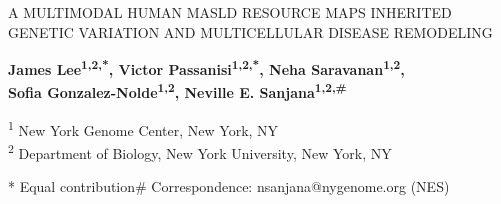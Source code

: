 \documentclass[10pt,letterpaper]{article}
\begin{document}
\thispagestyle{plain}
\vspace*{0.25in}
\begin{center}
{\fontsize{16}{18}\selectfont\MakeUppercase{A multimodal human MASLD resource maps inherited genetic variation and multicellular disease remodeling}\par}
\vspace{1.5em}
{\bfseries James Lee\textsuperscript{1,2,*}, Victor Passanisi\textsuperscript{1,2,*}, Neha Saravanan\textsuperscript{1,2},\\
Sofia Gonzalez-Nolde\textsuperscript{1,2}, Neville E. Sanjana\textsuperscript{1,2,\#}\par}
\vspace{0.7em}
{\fontsize{9}{10}\selectfont
\textsuperscript{1} New York Genome Center, New York, NY\\
\textsuperscript{2} Department of Biology, New York University, New York, NY\par
\vspace{0.5em}
* Equal contribution\quad \# Correspondence: nsanjana@nygenome.org (NES)\par}
\end{center}
\vspace{0.7em}
\begin{abstract}

\end{abstract}










\end{document}
